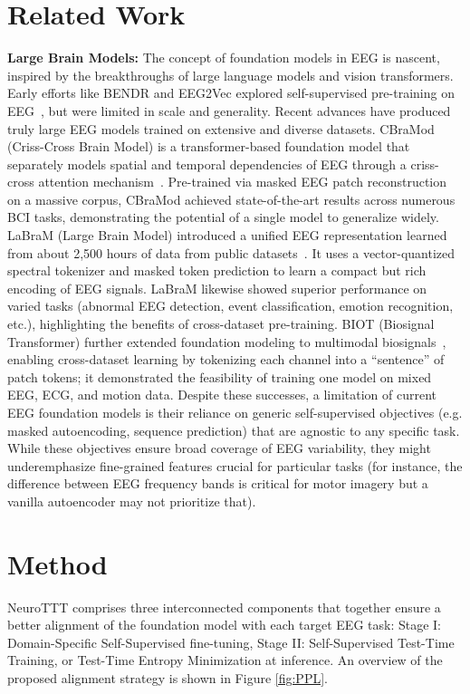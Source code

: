 \documentclass{article} %
\begin{document}
\section{Related Work}
\textbf{Large Brain Models:} The concept of foundation models in EEG is nascent, inspired by the breakthroughs of large language models and vision transformers. Early efforts like BENDR and EEG2Vec explored self-supervised pre-training on EEG~\citep{kostas2021bendr,bethge2022eeg2vec}, but were limited in scale and generality. Recent advances have produced truly large EEG models trained on extensive and diverse datasets. CBraMod (Criss-Cross Brain Model) is a transformer-based foundation model that separately models spatial and temporal dependencies of EEG through a criss-cross attention mechanism~\citep{wang2024cbramod}. Pre-trained via masked EEG patch reconstruction on a massive corpus, CBraMod achieved state-of-the-art results across numerous BCI tasks, demonstrating the potential of a single model to generalize widely. LaBraM (Large Brain Model) introduced a unified EEG representation learned from about 2,500 hours of data from public datasets~\citep{jiang2024large}. It uses a vector-quantized spectral tokenizer and masked token prediction to learn a compact but rich encoding of EEG signals. LaBraM likewise showed superior performance on varied tasks (abnormal EEG detection, event classification, emotion recognition, etc.), highlighting the benefits of cross-dataset pre-training. BIOT (Biosignal Transformer) further extended foundation modeling to multimodal biosignals~\citep{yang2023biot}, enabling cross-dataset learning by tokenizing each channel into a “sentence” of patch tokens; it demonstrated the feasibility of training one model on mixed EEG, ECG, and motion data. Despite these successes, a limitation of current EEG foundation models is their reliance on generic self-supervised objectives (e.g. masked autoencoding, sequence prediction) that are agnostic to any specific task. While these objectives ensure broad coverage of EEG variability, they might underemphasize fine-grained features crucial for particular tasks (for instance, the difference between EEG frequency bands is critical for motor imagery but a vanilla autoencoder may not prioritize that).

\section{Method}
\label{sec:Method}
NeuroTTT comprises three interconnected components that together ensure a better alignment of the foundation model with each target EEG task: Stage I: Domain-Specific Self-Supervised fine-tuning, Stage II: Self-Supervised Test-Time Training, or Test-Time Entropy Minimization  at inference. An overview of the proposed alignment strategy is shown in Figure \ref{fig:PPL}. 
\end{document}
